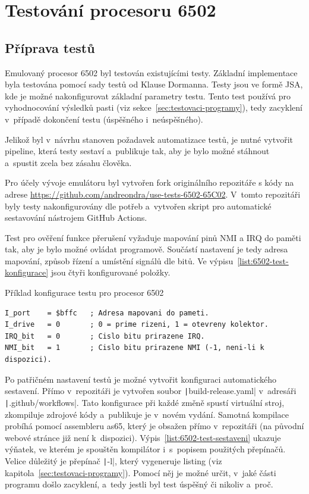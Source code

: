 \section{Testování procesoru 6502}
\subsection{Příprava testů}
Emulovaný procesor 6502 byl testován existujícími testy. Základní implementace byla testována pomocí sady testů od Klause Dormanna. Testy jsou ve formě JSA, kde je možné nakonfigurovat základní parametry testu. Tento test používá pro vyhodnocování výsledků pasti (viz sekce~\ref{sec:testovaci-programy}), tedy zacyklení v~případě dokončení testu (úspěšného i~neúspěšného).

Jelikož byl v~návrhu stanoven požadavek automatizace testů, je nutné vytvořit pipeline, která testy sestaví a~publikuje tak, aby je bylo možné stáhnout a~spustit zcela bez zásahu člověka.

Pro účely vývoje emulátoru byl vytvořen fork originálního repozitáře s kódy na adrese \url{https://github.com/andreondra/use-tests-6502-65C02}. V~tomto repozitáři byly testy nakonfigurovány dle potřeb a~vytvořen skript pro automatické sestavování nástrojem GitHub Actions.

Test pro ověření funkce přerušení vyžaduje mapování pinů NMI a IRQ do paměti tak, aby je bylo možné ovládat programově. Součástí nastavení je tedy adresa mapování, způsob řízení a umístění signálů dle bitů. Ve výpisu~\ref{list:6502-test-konfigurace} jsou čtyři konfigurované položky.

\begin{listing}
	\caption{Příklad konfigurace testu pro procesor 6502}
	\label{list:6502-test-konfigurace}
	\begin{verbatim}
I_port    = $bffc   ; Adresa mapovani do pameti.
I_drive   = 0       ; 0 = prime rizeni, 1 = otevreny kolektor.
IRQ_bit   = 0       ; Cislo bitu prirazene IRQ.
NMI_bit   = 1       ; Cislo bitu prirazene NMI (-1, neni-li k dispozici).
	\end{verbatim}
\end{listing}

Po patřičném nastavení testů je možné vytvořit konfiguraci automatického sestavení. Přímo v~repozitáři je vytvořen soubor \texttt|build-release.yaml| v~adresáři \texttt|.github/workflows|. Tato konfigurace při každé změně spustí virtuální stroj, zkompiluje zdrojové kódy a~publikuje je v~novém vydání. Samotná kompilace probíhá pomocí assembleru as65, který je obsažen přímo v~repozitáři (na původní webové stránce již není k~dispozici). Výpis~\ref{list:6502-test-sestaveni} ukazuje výňatek, ve kterém je spouštěn kompilátor i~s~popisem použitých přepínačů. Velice důležitý je přepínač \texttt|-l|, který vygeneruje listing (viz kapitola~\ref{sec:testovaci-programy}). Pomocí něj je možné určit, v~jaké části programu došlo zacyklení, a~tedy jestli byl test úspěšný či nikoliv a~proč.

